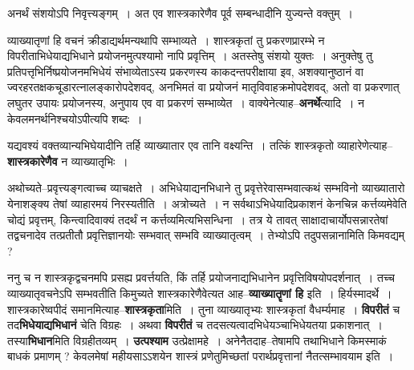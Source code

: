 \documentclass[article,12pt,a4paper]{memoir}
\begin{document}
	अनर्थं संशयोऽपि निवृत्त्यङ्गम् । अत एव शास्त्रकारेणैव पूर्व सम्बन्धादीनि युज्यन्ते वक्तुम् ।  
	  
	व्याख्यातृणां हि वचनं क्रीडाद्यर्थमन्यथापि सम्भाव्यते । शास्त्रकृतां तु प्रकरणप्रारम्भे न विपरीताभिधेयाद्यभिधाने प्रयोजनमुत्पश्यामो नापि प्रवृत्तिम् । अतस्तेषु संशयो युक्तः । अनुक्तेषु तु प्रतिपत्तृभिर्निष्प्रयोजनमभिधेयं संभाव्येताऽस्य प्रकरणस्य काकदन्तपरीक्षाया इव, अशक्यानुष्ठानं वा ज्वरहरतक्षकचूडारत्नालङ्कारोपदेशवद्, अनभिमतं वा प्रयोजनं मातृविवाहक्रमोपदेशवद्, अतो वा प्रकरणात् लघुतर उपायः प्रयोजनस्य, अनुपाय एव वा प्रकरणं सम्भाव्येत । वाक्येनेत्याह--\textbf{अनर्थे}त्यादि । न केवलमनर्थनिश्चयोऽपीत्यपि शब्दः ।
	\pend
      

	  \pstart यद्यवश्यं वक्तव्यान्यभिघेयादीनि तर्हि व्याख्यातार एव तानि वक्ष्यन्ति । तत्किं शास्त्रकृतो व्याहारेणेत्याह--\textbf{शास्त्रकारेणैव} न व्याख्यातृभिः ।
	\pend
      

	  \pstart अथोच्यते--प्रवृत्त्यङ्गत्वाच्च व्याचक्षते । अभिधेयाद्यनभिधाने तु प्रवृत्तेरेवासम्भवात्कथं सम्भविनो व्याख्यातारो येनाशङ्क्य तेषां व्याहारमयं निरस्यतीति । अत्रोच्यते । न सर्वथाऽभिधेयादिप्रकाशनं केनचिन्न कर्त्तव्यमेवेति चोद्यं प्रवृत्तम्, किन्त्वादिवाक्यं तदर्थं न कर्त्तव्यमित्यभिसन्धिना । तत्र ये तावत् साक्षादाचार्योपसन्नारतेषां तद्वचनादेव तत्प्रतीतौ प्रवृत्तिज्ञानयोः सम्भवात् सम्भवि व्याख्यातृत्वम् । तेभ्योऽपि तदुपसन्नानामिति किमवद्यम् ?
	\pend
      

	  \pstart ननु च न शास्त्रकृद्वचनमपि प्रसह्य प्रवर्त्तयति, किं तर्हि प्रयोजनाद्यभिधानेन प्रवृत्तिविषयोपदर्शनात् । तच्च व्याख्यातृवचनेऽपि सम्भवतीति किमुच्यते शास्त्रकारेणैवेत्यत आह--\textbf{व्याख्यातॄणां हि} इति । हिर्यस्मादर्थे । शास्त्रकारेष्वपीदं समानमित्याह--\textbf{शास्त्रकृता}मिति । तुना व्याख्यातृभ्यः शास्त्रकृतां वैधर्म्यमाह । \textbf{विपरीतं} च तद\textbf{भिधेयाद्यभिधानं} चेति विग्रहः । अथवा \textbf{विपरीतं} च तदसत्यत्वादभिधेयञ्चाभिधेयतया प्रकाशनात् । तस्या\textbf{भिधान}मिति विग्रहीतव्यम् । \textbf{उत्पश्याम} उत्प्रेक्षामहे । अनेनैतदाह--तेषामपि तथाभिधाने किमस्माकं बाधकं प्रमाणम् ? केवलमेषां महीयसाऽऽशयेन शास्त्रं प्रणेतुमिच्छतां परार्थप्रवृत्तानां नैतत्सम्भावयाम इति ।
	\pend
      
\end{document}
